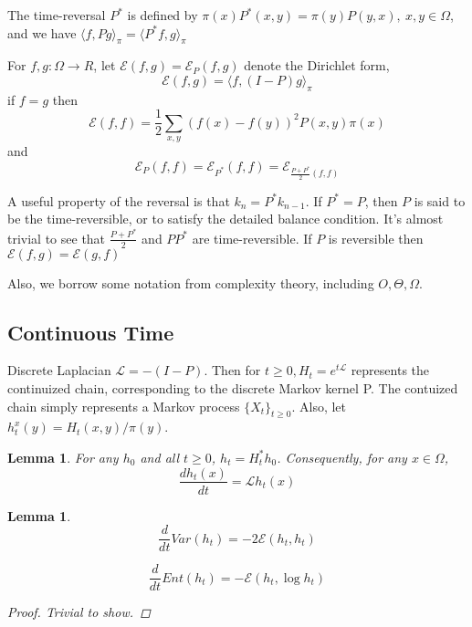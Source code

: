 \documentclass[12pt,reqno]{amsart}
\newtheorem{lem}[thm]{Lemma}
\begin{document}
The time-reversal $P^*$ is defined by $\pi(x)P^*(x,y) = \pi(y)P(y,x),~x,y\in\Omega$, 
and we have $\langle f,Pg\rangle_{\pi}=\langle P^*f,g\rangle_{\pi}$

For $f,g:\Omega\rightarrow R$, let $\mathcal{E}(f,g) = \mathcal{E}_P(f,g)$ denote the Dirichlet form,
\begin{equation}
  \mathcal{E}(f,g) = \langle f,(I-P)g \rangle_{\pi}
\end{equation}
if $f=g$ then
\begin{equation}
  \mathcal{E}(f,f) = \frac{1}{2}\sum_{x,y}(f(x)-f(y))^2P(x,y)\pi(x)
\end{equation}
and
\begin{equation}
  \mathcal{E}_P(f,f) = \mathcal{E}_{P^*}(f,f) = \mathcal{E}_{\frac{P+P^*}{2}(f,f)}
\end{equation}

A useful property of the reversal is that $k_n = P^*k_{n-1}$. If $P^*=P$, then $P$ is said to be the time-reversible, or to satisfy the detailed balance condition. It's almost trivial to see that
$\frac{P+P^*}{2}$  and $PP^*$ are time-reversible.
If $P$ is reversible then $\mathcal{E}(f,g) = \mathcal{E}(g,f)$


Also, we borrow some notation from complexity theory, including $O,\Theta,\Omega$.





\subsection{Continuous Time}
Discrete Laplacian $\mathcal{L} = -(I-P)$. Then for $t\geq 0, H_t = e^{t\mathcal{L}}$ represents the continuized chain, corresponding to the discrete Markov kernel P. The contuized chain simply represents a Markov process $\{X_t\}_{t\geq 0}$. Also, let $h_t^x(y) = H_t(x,y)/\pi(y)$.

\begin{lem}
For any $h_0$ and all $t \geq 0$, $h_t = H^*_th_0$. Consequently, for any $x \in \Omega$,
$$
\frac{dh_t(x)}{dt} = \mathcal{L}h_t(x)
$$
\end{lem}

\begin{lem}
  \begin{equation}
    \frac{d}{dt}Var(h_t) = -2 \mathcal{E}(h_t,h_t)
  \end{equation}

  \begin{equation}
    \frac{d}{dt}Ent(h_t) = - \mathcal{E}(h_t,\log h_t)
  \end{equation}

  \begin{proof}
    Trivial to show.
  \end{proof}
\end{lem}
\end{document}
